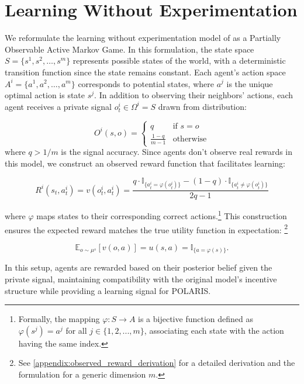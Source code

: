 \section{Learning Without Experimentation}

We reformulate the learning without experimentation model of \citet{brandl2024} as a Partially Observable Active Markov Game. In this formulation, the state space $S = \{s^1, s^2, \ldots, s^m\}$ represents possible states of the world, with a deterministic transition function since the state remains constant. Each agent's action space $A^i = \{a^1, a^2, \ldots, a^m\}$ corresponds to potential states, where $a^j$ is the unique optimal action is state $s^j$. In addition to observing their neighbors' actions, each agent receives a private signal $o^i_t \in \Omega^i = S$ drawn from distribution:

\begin{equation*}
    O^i(s,o) =
    \begin{cases}
        q               & \text{if } s = o \\
        \frac{1-q}{m-1} & \text{otherwise}
    \end{cases}
\end{equation*}
where $q > 1/m$ is the signal accuracy. Since agents don't observe real rewards in this model, we construct an observed reward function that facilitates learning:

\begin{equation*}
    R^i(s_t, a^i_t) = v(o^i_t, a^i_t) = \frac{q \cdot \mathbb{I}_{\{a^i_t = \varphi(o^i_t)\}} - (1 - q) \cdot \mathbb{I}_{\{a^i_t \neq \varphi(o^i_t)\}}}{2q - 1}
\end{equation*}

where $\varphi$ maps states to their corresponding correct actions.\footnote{Formally, the mapping $\varphi: S \rightarrow A$ is a bijective function defined as $\varphi(s^j) = a^j$ for all $j \in \{1,2,...,m\}$, associating each state with the action having the same index.} This construction ensures the expected reward matches the true utility function in expectation: \footnote{See \ref{appendix:observed_reward_derivation} for a detailed derivation and the formulation for a generic dimension $m$.}

\begin{equation*}
    \mathbb{E}_{o \sim \mu^{s}}[v(o, a)] = u(s, a) = \mathbb{I}_{\{a = \varphi(s)\}}.
\end{equation*}


In this setup, agents are rewarded based on their posterior belief given the private signal, maintaining compatibility with the original model's incentive structure while providing a learning signal for POLARIS.

